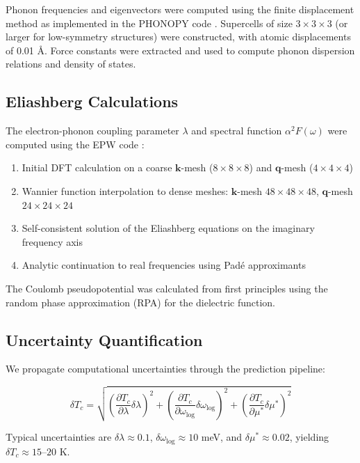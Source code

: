 \documentclass[twocolumn,superscriptaddress]{revtex4-2}
\begin{document}
Phonon frequencies and eigenvectors were computed using the finite displacement method as implemented in the PHONOPY code \cite{togo2015}. Supercells of size $3\times3\times3$ (or larger for low-symmetry structures) were constructed, with atomic displacements of 0.01 \AA. Force constants were extracted and used to compute phonon dispersion relations and density of states.

\subsection{Eliashberg Calculations}

The electron-phonon coupling parameter $\lambda$ and spectral function $\alpha^2F(\omega)$ were computed using the EPW code \cite{ponce2016,giustino2017}:

\begin{enumerate}
\item Initial DFT calculation on a coarse $\mathbf{k}$-mesh ($8\times8\times8$) and $\mathbf{q}$-mesh ($4\times4\times4$)
\item Wannier function interpolation to dense meshes: $\mathbf{k}$-mesh $48\times48\times48$, $\mathbf{q}$-mesh $24\times24\times24$
\item Self-consistent solution of the Eliashberg equations on the imaginary frequency axis
\item Analytic continuation to real frequencies using Pad\'{e} approximants
\end{enumerate}

The Coulomb pseudopotential was calculated from first principles using the random phase approximation (RPA) for the dielectric function.

\subsection{Uncertainty Quantification}

We propagate computational uncertainties through the prediction pipeline:

\begin{equation}
\delta T_c = \sqrt{\left(\frac{\partial T_c}{\partial \lambda}\delta\lambda\right)^2 + \left(\frac{\partial T_c}{\partial \omega_{\text{log}}}\delta\omega_{\text{log}}\right)^2 + \left(\frac{\partial T_c}{\partial \mu^*}\delta\mu^*\right)^2}
\end{equation}

Typical uncertainties are $\delta\lambda \approx 0.1$, $\delta\omega_{\text{log}} \approx 10$ meV, and $\delta\mu^* \approx 0.02$, yielding $\delta T_c \approx 15$--$20$ K.
\end{document}
